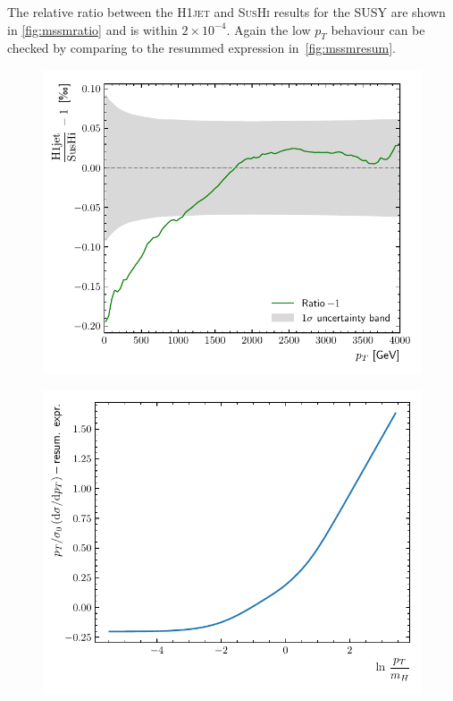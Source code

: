 \documentclass[12pt]{article}
\begin{document}
The relative ratio between the \textsc{H1jet} and \textsc{SusHi} results for the SUSY are shown in \autoref{fig:mssmratio} and is within $2 \times 10^{-4}$. Again the low $p_T$ behaviour can be checked by comparing to the resummed expression in~\autoref{fig:mssmresum}. 
\begin{figure}[tbh] 
\centering
\begin{minipage}{.485\textwidth}
  \centering
  \includegraphics[width=\linewidth]{figures/SUSYratio.pdf}
  \label{fig:mssmratio}
\end{minipage}%
\hfill%
\begin{minipage}{.485\textwidth}
  \centering
  \includegraphics[width=\linewidth]{figures/SUSYresum}
  \label{fig:mssmresum}
\end{minipage}
\end{figure}
\end{document}
